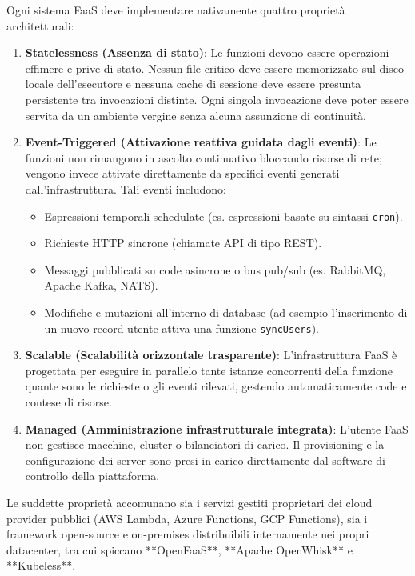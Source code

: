 \documentclass[11pt, a4paper]{article}
\begin{document}
Ogni sistema FaaS deve implementare nativamente quattro proprietà architetturali:
\begin{enumerate}
    \item \textbf{Statelessness (Assenza di stato)}: Le funzioni devono essere operazioni effimere e prive di stato. Nessun file critico deve essere memorizzato sul disco locale dell'esecutore e nessuna cache di sessione deve essere presunta persistente tra invocazioni distinte. Ogni singola invocazione deve poter essere servita da un ambiente vergine senza alcuna assunzione di continuità.

    \item \textbf{Event-Triggered (Attivazione reattiva guidata dagli eventi)}: Le funzioni non rimangono in ascolto continuativo bloccando risorse di rete; vengono invece attivate direttamente da specifici eventi generati dall'infrastruttura. Tali eventi includono:
    \begin{itemize}[noitemsep]
        \item Espressioni temporali schedulate (es. espressioni basate su sintassi \texttt{cron}).
        \item Richieste HTTP sincrone (chiamate API di tipo REST).
        \item Messaggi pubblicati su code asincrone o bus pub/sub (es. RabbitMQ, Apache Kafka, NATS).
        \item Modifiche e mutazioni all'interno di database (ad esempio l'inserimento di un nuovo record utente attiva una funzione \texttt{syncUsers}).
    \end{itemize}

    \item \textbf{Scalable (Scalabilità orizzontale trasparente)}: L'infrastruttura FaaS è progettata per eseguire in parallelo tante istanze concorrenti della funzione quante sono le richieste o gli eventi rilevati, gestendo automaticamente code e contese di risorse.

    \item \textbf{Managed (Amministrazione infrastrutturale integrata)}: L'utente FaaS non gestisce macchine, cluster o bilanciatori di carico. Il provisioning e la configurazione dei server sono presi in carico direttamente dal software di controllo della piattaforma.
\end{enumerate}

Le suddette proprietà accomunano sia i servizi gestiti proprietari dei cloud provider pubblici (AWS Lambda, Azure Functions, GCP Functions), sia i framework open-source e on-premises distribuibili internamente nei propri datacenter, tra cui spiccano **OpenFaaS**, **Apache OpenWhisk** e **Kubeless**.
\end{document}

